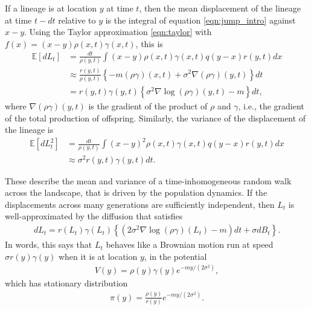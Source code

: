 \documentclass{article}
\newcommand{\E}{\mathbb{E}}
\newcommand{\grad}{\nabla}
\begin{document}
If a lineage is at location $y$ at time $t$,
then the mean displacement of the lineage at time $t - dt$ relative to $y$
is the integral of equation \eqref{eqn:jump_intro} against $x - y$.
Using the Taylor approximation \eqref{eqn:taylor} with $f(x) = (x - y) \rho(x,t) \gamma(x,t)$,
this is
\begin{align*}
    \E[dL_t]
    &=
    \frac{dt}{\rho(y, t)} \int (x - y) \rho(x, t) \gamma(x, t) q(y - x) r(y, t) dx \\
    &\approx
    \frac{r(y, t)}{\rho(y, t)} \left\{
            - m \left( \rho \gamma \right)(x, t)
            + \sigma^2 \grad\left( \rho \gamma \right)(y, t)
        \right\} dt \\
    &=
    r(y, t) \gamma(y, t) \left\{
        \sigma^2 \grad \log\left(\rho \gamma \right)(y, t) 
        - m 
    \right\} dt,
\end{align*}
where $\grad(\rho \gamma)(y,t)$ is the gradient of the product of $\rho$ and $\gamma$,
i.e., the gradient of the total production of offspring.
Similarly,
the variance of the displacement of the lineage is
\begin{align*}
    \E[dL_t^2]
    &=
        \frac{dt}{\rho(y, t)} \int (x - y)^2 \rho(x, t) \gamma(x, t) q(y - x) r(y, t) dx \\
    &\approx 
        \sigma^2 r(y, t) \gamma(y,t) dt .
\end{align*}

These describe the mean and variance of a time-inhomogeneous random walk across the landscape,
that is driven by the population dynamics.
If the displacements across many generations are sufficiently independent,
then $L_t$ is well-approximated by the diffusion that satisfies
\begin{align}
    dL_t =  r(L_t) \gamma(L_t)
        \left\{
            \left( 2 \sigma^2 \grad \log \left(\rho \gamma\right)(L_t) - m \right) dt
            + \sigma dB_t
        \right\} .
\end{align}
In words, this says that $L_t$ behaves like a Brownian motion
run at speed $\sigma r(y) \gamma(y)$ when it is at location $y$,
in the potential
\begin{align}
    V(y) = \rho(y) \gamma(y) e^{-my/(2\sigma^2)} ,
\end{align}
which has stationary distribution
\begin{align}
    \pi(y) = \frac{\rho(y)}{r(y)} e^{-my/(2\sigma^2)} .
\end{align}
\end{document}
